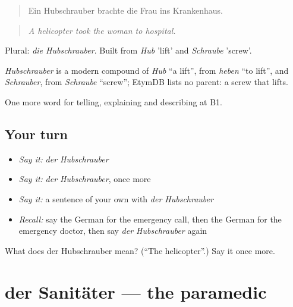 \begin{quote}
Ein Hubschrauber brachte die Frau ins Krankenhaus.
\end{quote}

\begin{quote}
\emph{A helicopter took the woman to hospital.}
\end{quote}

Plural: \emph{die Hubschrauber}. Built from \emph{Hub} 'lift' and \emph{Schraube} 'screw'.

\begin{cousinweb}
\emph{Hubschrauber} is a modern compound of \emph{Hub} \textquotedblleft{}a lift\textquotedblright{}, from \emph{heben} \textquotedblleft{}to lift\textquotedblright{}, and \emph{Schrauber}, from \emph{Schraube} \textquotedblleft{}screw\textquotedblright{}; EtymDB lists no parent: a screw that lifts.
\end{cousinweb}

\begin{grammarlens}[title={What you've built}]
One more word for telling, explaining and describing at B1.
\end{grammarlens}

\subsection*{Your turn}
\begin{itemize}
\raggedright
  \item \emph{Say it:} \emph{der Hubschrauber}
  \item \emph{Say it:} \emph{der Hubschrauber}, once more
  \item \emph{Say it:} a sentence of your own with \emph{der Hubschrauber}
  \item \emph{Recall:} say the German for the emergency call, then the German for the emergency doctor, then say \emph{der Hubschrauber} again
\end{itemize}

\begin{tcolorbox}[breakable,colback=teal!4,colframe=teal!35!black,title={Before you move on}]
What does der Hubschrauber mean? (\textquotedblleft{}The helicopter\textquotedblright{}.) Say it once more.
\end{tcolorbox}
\section[der Sanitäter]{der Sanitäter — the paramedic}

